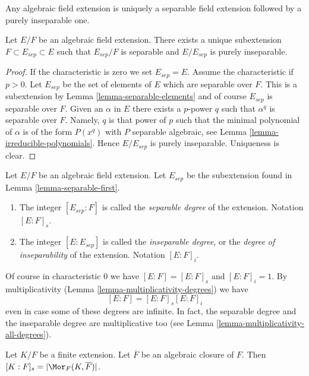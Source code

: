 \begin{lemma}
\label{lemma-separable-first}
\begin{slogan}
Any algebraic field extension is uniquely a separable field extension
followed by a purely inseparable one.
\end{slogan}
Let $E/F$ be an algebraic field extension. There exists a unique subextension
$F \subset E_{sep} \subset E$ such that $E_{sep}/F$ is separable and
$E/E_{sep}$ is purely inseparable.
\end{lemma}

\begin{proof}
If the characteristic is zero we set $E_{sep} = E$. Assume the characteristic
if $p > 0$. Let $E_{sep}$ be the set of elements of $E$ which are separable
over $F$. This is a subextension by Lemma \ref{lemma-separable-elements}
and of course $E_{sep}$ is separable over $F$. Given an $\alpha$ in $E$
there exists a $p$-power $q$ such that $\alpha^q$ is separable over $F$.
Namely, $q$ is that power of $p$ such that the minimal polynomial of
$\alpha$ is of the form $P(x^q)$ with $P$ separable algebraic, see
Lemma \ref{lemma-irreducible-polynomials}. Hence $E/E_{sep}$ is purely
inseparable. Uniqueness is clear.
\end{proof}

\begin{definition}
\label{definition-insep-degree}
Let $E/F$ be an algebraic field extension. Let $E_{sep}$ be the subextension
found in Lemma \ref{lemma-separable-first}.
\begin{enumerate}
\item The integer $[E_{sep} : F]$ is called the {\it separable
degree} of the extension. Notation $[E : F]_s$.
\item The integer $[E : E_{sep}]$ is called the {\it inseparable
degree}, or the {\it degree of inseparability} of the extension.
Notation $[E : F]_i$.
\end{enumerate}
\end{definition}

\noindent
Of course in characteristic $0$ we have $[E : F] = [E : F]_s$ and
$[E : F]_i = 1$. By multiplicativity
(Lemma \ref{lemma-multiplicativity-degrees}) we have
$$
[E : F] = [E : F]_s [E : F]_i
$$
even in case some of these degrees are infinite. In fact, the separable
degree and the inseparable degree are multiplicative too (see
Lemma \ref{lemma-multiplicativity-all-degrees}).

\begin{lemma}
\label{lemma-separable-degree}
Let $K/F$ be a finite extension. Let $\overline{F}$ be an algebraic
closure of $F$. Then $[K : F]_s = |\Mor_F(K, \overline{F})|$.
\end{lemma}

